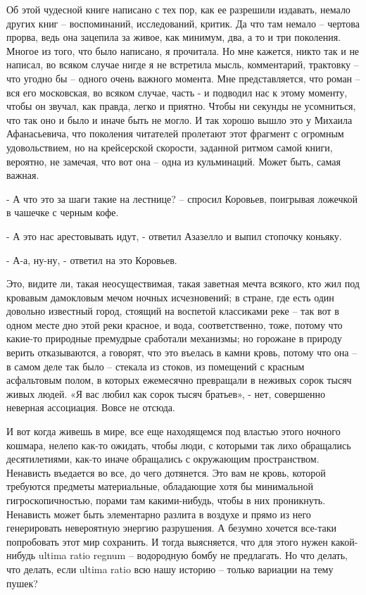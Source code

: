 Об этой чудесной книге написано с тех пор, как ее разрешили издавать, немало
других книг – воспоминаний, исследований, критик. Да что там немало – чертова
прорва, ведь она зацепила за живое, как минимум, два, а то и три поколения.
Многое из того, что было написано, я прочитала. Но мне кажется, никто так и не
написал, во всяком случае нигде я не встретила мысль, комментарий, трактовку –
что угодно бы – одного очень важного момента. Мне представляется, что роман –
вся его московская, во всяком случае, часть - и подводил нас к этому моменту,
чтобы он звучал, как правда, легко и приятно. Чтобы ни секунды не усомниться,
что так оно и было и иначе быть не могло. И так хорошо вышло это у Михаила
Афанасьевича, что поколения читателей пролетают этот фрагмент с огромным
удовольствием, но на крейсерской скорости, заданной ритмом самой книги,
вероятно, не замечая, что вот она – одна из кульминаций. Может быть, самая
важная.

- А что это за шаги такие на лестнице? – спросил Коровьев, поигрывая ложечкой в
чашечке с черным кофе.

- А это нас арестовывать идут, - ответил Азазелло и выпил стопочку коньяку.

- А-а, ну-ну, - ответил на это Коровьев.

Это, видите ли, такая неосуществимая, такая заветная мечта всякого, кто жил под
кровавым дамокловым мечом ночных исчезновений; в стране, где есть один довольно
известный город, стоящий на воспетой классиками реке – так вот в одном месте
дно этой реки красное, и вода, соответственно, тоже, потому что какие-то
природные премудрые сработали механизмы; но горожане в природу верить
отказываются, а говорят, что это въелась в камни кровь, потому что она – в
самом деле так было – стекала из стоков, из помещений с красным асфальтовым
полом, в которых ежемесячно превращали в неживых сорок тысяч живых людей. «Я
вас любил как сорок тысяч братьев», - нет, совершенно неверная ассоциация.
Вовсе не отсюда.

И вот когда живешь в мире, все еще находящемся под властью этого ночного
кошмара, нелепо как-то ожидать, чтобы люди, с которыми так лихо обращались
десятилетиями, как-то иначе обращались с окружающим пространством. Ненависть
въедается во все, до чего дотянется. Это вам не кровь, которой требуются
предметы материальные, обладающие хотя бы минимальной гигроскопичностью, порами
там какими-нибудь, чтобы в них проникнуть. Ненависть может быть элементарно
разлита в воздухе и прямо из него генерировать невероятную энергию разрушения.
А безумно хочется все-таки попробовать этот мир сохранить. И тогда выясняется,
что для этого нужен какой-нибудь ultima ratio regnum – водородную бомбу не
предлагать. Но что делать, что делать, если ultima ratio всю нашу историю –
только вариации на тему пушек?

